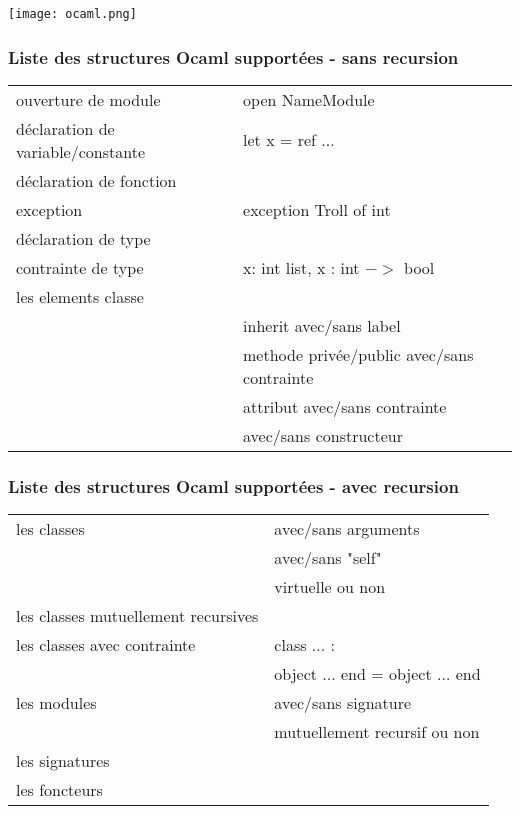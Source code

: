 \documentclass{beamer}
\begin{document}
\begin{frame}
    \texttt{[image: ocaml.png]}
\end{frame}


\begin{frame}
\frametitle{Liste des structures Ocaml supportées - sans recursion}
    \begin{tabular}{ll}
         ouverture de module & open NameModule\\
         \pause
         déclaration de variable/constante & let x = ref ... \\
         \pause
         déclaration de fonction & \\
         \pause
         exception & exception Troll of int\\
         \pause
         déclaration de type & \\
         \pause
         contrainte de type & x: int list, x : int $->$ bool\\ 
         \pause
         les elements classe & \\
         & inherit avec/sans label\\
         & methode privée/public avec/sans contrainte\\
         & attribut avec/sans contrainte\\
         & avec/sans constructeur\\
    \end{tabular}
\end{frame}

\begin{frame}
\frametitle{Liste des structures Ocaml supportées - avec recursion}
    \begin{tabular}{ll}
        les classes & avec/sans arguments\\
        & avec/sans "self"\\
        & virtuelle ou non\\
        \pause            
        les classes mutuellement recursives & \\
        \pause
        les classes avec contrainte & class ... :\\
        & object ... end = object ... end\\
         
        les modules & avec/sans signature\\
        \pause
        & mutuellement recursif ou non\\
        les signatures & \\
        \pause
        les foncteurs & \\
    \end{tabular}
\end{frame}
\end{document}
